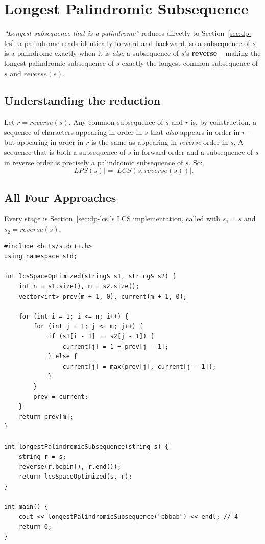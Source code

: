 \section{Longest Palindromic Subsequence}
\label{sec:dp-longest-palindromic-subsequence}


\begin{patternbox}
\emph{``Longest subsequence that is a palindrome''} reduces directly to
Section~\ref{sec:dp-lcs}: a palindrome reads identically forward and
backward, so a subsequence of $s$ is a palindrome exactly when it is
\emph{also} a subsequence of $s$'s \textbf{reverse} -- making the longest
palindromic subsequence of $s$ exactly the longest common subsequence of
$s$ and $\textit{reverse}(s)$.
\end{patternbox}

\subsection*{Understanding the reduction}

Let $r = \textit{reverse}(s)$. Any common subsequence of $s$ and $r$
is, by construction, a sequence of characters appearing in order in $s$
that \emph{also} appears in order in $r$ -- but appearing in order in $r$
is the same as appearing in \emph{reverse} order in $s$. A sequence that
is both a subsequence of $s$ in forward order and a subsequence of $s$
in reverse order is precisely a palindromic subsequence of $s$. So:
\[
  |\textit{LPS}(s)| = |\textit{LCS}(s, \textit{reverse}(s))|.
\]

\subsection*{All Four Approaches}

Every stage is Section~\ref{sec:dp-lcs}'s LCS implementation, called
with $s_1 = s$ and $s_2 = \textit{reverse}(s)$.

\begin{lstlisting}
#include <bits/stdc++.h>
using namespace std;

int lcsSpaceOptimized(string& s1, string& s2) {
    int n = s1.size(), m = s2.size();
    vector<int> prev(m + 1, 0), current(m + 1, 0);

    for (int i = 1; i <= n; i++) {
        for (int j = 1; j <= m; j++) {
            if (s1[i - 1] == s2[j - 1]) {
                current[j] = 1 + prev[j - 1];
            } else {
                current[j] = max(prev[j], current[j - 1]);
            }
        }
        prev = current;
    }
    return prev[m];
}

int longestPalindromicSubsequence(string s) {
    string r = s;
    reverse(r.begin(), r.end());
    return lcsSpaceOptimized(s, r);
}

int main() {
    cout << longestPalindromicSubsequence("bbbab") << endl; // 4
    return 0;
}
\end{lstlisting}

